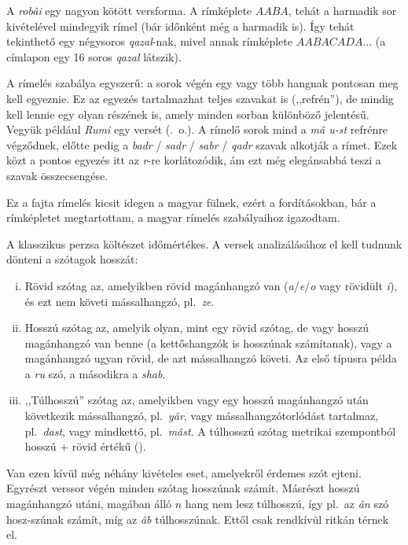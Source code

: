A \emph{robâi} egy nagyon kötött versforma. A rímképlete $AABA$, tehát
a harmadik sor kivételével mindegyik rímel (bár időnként még a
harmadik is). Így tehát tekinthető egy négysoros \emph{qazal}-nak,
mivel annak rímképlete $AABACADA\dots$ (a címlapon egy 16 soros
\emph{qazal} látszik).

A rímelés szabálya egyszerű: a sorok végén egy vagy több hangnak
pontosan meg kell egyeznie. Ez az egyezés tartalmazhat teljes szavakat
is (,,refrén''), de mindig kell lennie egy olyan részének is, amely
minden sorban különböző jelentésű. Vegyük például \emph{Rumi} egy versét
(\pageref{Rumi}.~o.). A rímelő sorok mind a \emph{mâ u-st} refrénre
végződnek, előtte pedig a
\emph{badr} / \emph{sadr} / \emph{sabr} / \emph{qadr} szavak alkotják a
rímet. Ezek közt a pontos egyezés itt az \emph{r}-re korlátozódik, ám
ezt még elegánsabbá teszi a szavak összecsengése.

Ez a fajta rímelés kicsit idegen a magyar fülnek, ezért a
fordításokban, bár a rímképletet megtartottam, a magyar rímelés
szabályaihoz igazodtam.

A klasszikus perzsa költészet időmértékes. A versek analizálásához
el kell tudnunk dönteni a szótagok hosszát:

\begin{enumerate}[i)]
  \item Rövid szótag az, amelyikben rövid magánhangzó van
    (\emph{a}/\emph{e}/\emph{o} vagy rövidült \emph{i}), és ezt nem
    követi mássalhangzó, pl.~\emph{ze}.
  \item Hosszú szótag az, amelyik olyan, mint egy rövid szótag, de
    vagy hosszú magánhangzó van benne (a kettőshangzók is hosszúnak
    számítanak), vagy a magánhangzó ugyan rövid, de azt mássalhangzó
    követi. Az első típusra példa a \emph{ru} szó, a másodikra a
    \emph{shab}.
  \item ,,Túlhosszú'' szótag az, amelyikben vagy egy hosszú magánhangzó
    után következik mássalhangzó, pl.~\emph{yâr}, vagy
    mássalhangzótorlódást tartalmaz, pl.~\emph{dast}, vagy mindkettő,
    pl.~\emph{mâst}. A túlhosszú szótag metrikai szempontból hosszú +
    rövid értékű (\metra{\m\b}).
\end{enumerate}

Van ezen kívül még néhány kivételes eset, amelyekről érdemes szót ejteni.
Egyrészt verssor végén minden szótag hosszúnak számít.
Másrészt hosszú magánhangzó utáni, magában álló $n$ hang
nem lesz túlhosszú, így pl.~az \emph{ân} szó hosz-szúnak számít, míg
az \emph{âb} túlhosszúnak. Ettől csak rendkívül ritkán térnek el.

